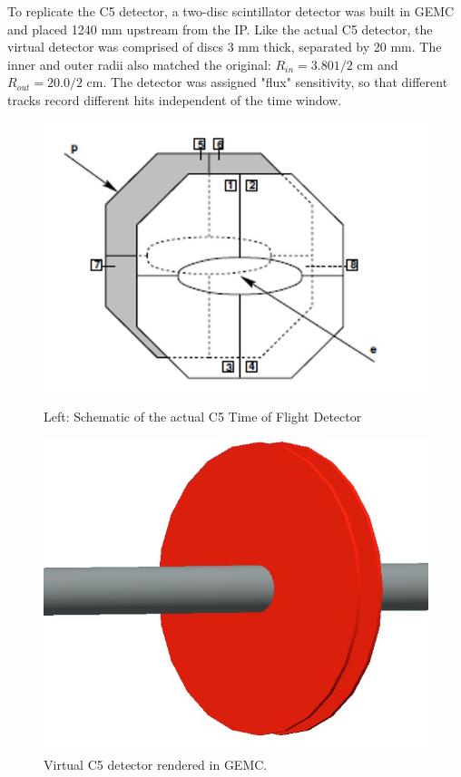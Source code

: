 To replicate the C5 detector, a two-disc scintillator detector was built in GEMC and placed 1240 mm upstream from the IP.  Like the actual C5 detector, the virtual detector was comprised of discs 3 mm thick, separated by 20 mm.  The inner and outer radii also matched the original: $R_{in} = 3.801/2$ cm and $R_{out} = 20.0/2$ cm.  The detector was assigned "flux" sensitivity, so that different tracks record different hits independent of the time window. 
\begin{figure}
	\centering
	\begin{minipage}{0.45\textwidth}
		\centering
		\includegraphics[width=.75\textwidth]{../../img/hera_c5.jpg}
		\caption {Left: Schematic of the actual C5 Time of Flight Detector  }
		\label{fig:hera5}
	\end{minipage}\hfill
	\begin{minipage}{0.45\textwidth}
		\centering	\includegraphics[width=.75\textwidth]{../../img/C5_gemc}	
		\caption {Virtual C5 detector rendered in GEMC.}
		\label{fig:hera6}
	\end{minipage}
\end{figure}

